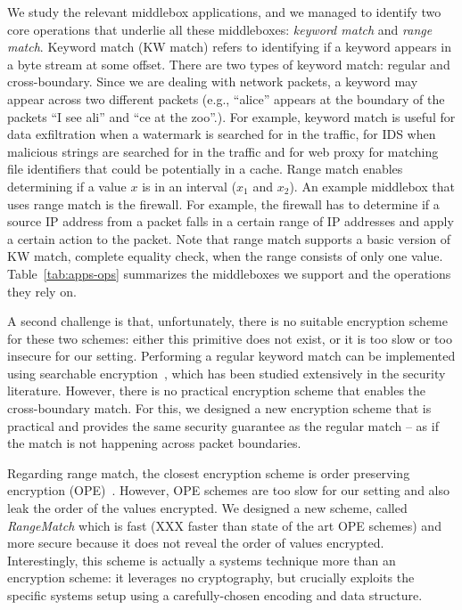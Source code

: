 We study the relevant middlebox applications, and we managed to identify two core operations that underlie all these middleboxes: {\em keyword match} and {\em range match}. Keyword match (KW match) refers to  identifying if a keyword appears in a byte stream at some offset. There are two types of keyword match: regular and cross-boundary. Since we are dealing with network packets, a keyword may appear across two different packets (e.g., ``alice'' appears at the boundary of the packets ``I see ali'' and ``ce at the zoo''.). For example, keyword match is useful for data exfiltration when a watermark is searched for in the traffic, for IDS when malicious strings are searched for in the traffic and for web proxy for matching file identifiers that could be potentially in a cache. 
Range match enables determining if a value $x$ is in an interval ($x_1$ and $x_2$). An example middlebox that uses range match is the firewall.   For example, the firewall has to determine if a source IP address from a packet falls in a certain range of IP addresses and apply a certain action to the packet.  Note that range match supports a basic version of KW match, complete equality check, when the range consists of only one value.
%
Table~\ref{tab:apps-ops} summarizes the middleboxes we support and the operations they rely on. 

A second challenge is that, unfortunately, there is no suitable encryption scheme for these two schemes: either this primitive does not exist, or it is too slow or too insecure for our setting. Performing a regular keyword match can be implemented using searchable encryption~\cite{song, blindbox, X}, which has been studied extensively in the security literature.
However, there is no practical encryption scheme that enables the cross-boundary match. 
For this, we designed a new encryption scheme that is practical and provides the same security guarantee as the regular match -- as if the match is not happening across packet boundaries. 

Regarding range match, the closest encryption scheme is order preserving encryption (OPE)~\cite{mope, BCLO}. However, OPE schemes are too slow for our setting and also leak the order of the values encrypted. We designed a new scheme, called {\em RangeMatch} which is fast (XXX faster than state of the art OPE schemes) and more secure because it does not reveal the order of values encrypted. Interestingly, this scheme is actually a systems technique more than an encryption scheme: it leverages no cryptography, but crucially  exploits the specific systems setup using a carefully-chosen encoding and data structure.

